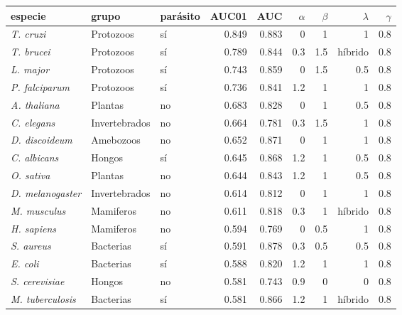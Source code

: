 \begin{tabular}{@{}lllrrrrrr@{}}
\toprule
especie & grupo & parásito & AUC01 & AUC & $\alpha$ & $\beta$ & $\lambda$ & $\gamma$ \\
\midrule
\textit{T. cruzi} & Protozoos & sí & 0.849 & 0.883 & 0 & 1 & 1 & 0.8 \\
\textit{T. brucei} & Protozoos & sí & 0.789 & 0.844 & 0.3 & 1.5 & híbrido & 0.8 \\
\textit{L. major} & Protozoos & sí & 0.743 & 0.859 & 0 & 1.5 & 0.5 & 0.8 \\
\textit{P. falciparum} & Protozoos & sí & 0.736 & 0.841 & 1.2 & 1 & 1 & 0.8 \\
\textit{A. thaliana} & Plantas & no & 0.683 & 0.828 & 0 & 1 & 0.5 & 0.8 \\
\textit{C. elegans} & Invertebrados & no & 0.664 & 0.781 & 0.3 & 1.5 & 1 & 0.8 \\
\textit{D. discoideum} & Amebozoos & no & 0.652 & 0.871 & 0 & 1 & 1 & 0.8 \\
\textit{C. albicans} & Hongos & sí & 0.645 & 0.868 & 1.2 & 1 & 0.5 & 0.8 \\
\textit{O. sativa} & Plantas & no & 0.644 & 0.843 & 1.2 & 1 & 0.5 & 0.8 \\
\textit{D. melanogaster} & Invertebrados & no & 0.614 & 0.812 & 0 & 1 & 1 & 0.8 \\
\textit{M. musculus} & Mamiferos & no & 0.611 & 0.818 & 0.3 & 1 & híbrido & 0.8 \\
\textit{H. sapiens} & Mamiferos & no & 0.594 & 0.769 & 0 & 0.5 & 1 & 0.8 \\
\textit{S. aureus} & Bacterias & sí & 0.591 & 0.878 & 0.3 & 0.5 & 0.5 & 0.8 \\
\textit{E. coli} & Bacterias & sí & 0.588 & 0.820 & 1.2 & 1 & 1 & 0.8 \\
\textit{S. cerevisiae} & Hongos & no & 0.581 & 0.743 & 0.9 & 0 & 0 & 0.8 \\
\textit{M. tuberculosis} & Bacterias & sí & 0.581 & 0.866 & 1.2 & 1 & híbrido & 0.8 \\
\bottomrule
\end{tabular}
